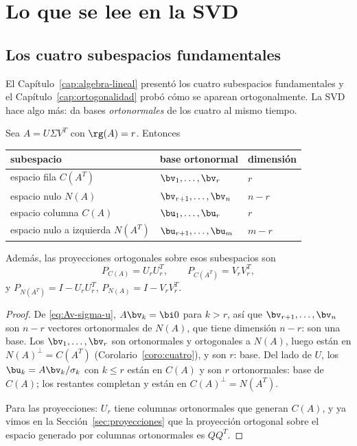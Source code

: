 \section{Lo que se lee en la SVD}
\label{sec:cuatro-SVD}

\subsection{Los cuatro subespacios fundamentales}

El Capítulo~\ref{cap:algebra-lineal} presentó los cuatro subespacios
fundamentales y el Capítulo~\ref{cap:ortogonalidad} probó cómo se aparean
ortogonalmente. La SVD hace algo más: da bases \emph{ortonormales} de los
cuatro al mismo tiempo.

\begin{proposition}\label{prop:cuatro-SVD}
Sea $A=U\Sigma V^T$ con $\rg(A)=r$. Entonces
\begin{center}
\renewcommand{\arraystretch}{1.25}
\begin{tabular}{@{}lll@{}}
\hline
subespacio & base ortonormal & dimensión\\
\hline
espacio fila $C(A^T)$ & $\bv_1,\dots,\bv_r$ & $r$\\
espacio nulo $N(A)$ & $\bv_{r+1},\dots,\bv_n$ & $n-r$\\
espacio columna $C(A)$ & $\bu_1,\dots,\bu_r$ & $r$\\
espacio nulo a izquierda $N(A^T)$ & $\bu_{r+1},\dots,\bu_m$ & $m-r$\\
\hline
\end{tabular}
\end{center}
Además, las proyecciones ortogonales sobre esos subespacios son
\[
P_{C(A)}=U_rU_r^T,
\qquad
P_{C(A^T)}=V_rV_r^T,
\]
y $P_{N(A^T)}=I-U_rU_r^T$, $P_{N(A)}=I-V_rV_r^T$.
\end{proposition}

\begin{proof}
De \eqref{eq:Av-sigma-u}, $A\bv_k=\bi 0$ para $k>r$, así que
$\bv_{r+1},\dots,\bv_n$ son $n-r$ vectores ortonormales de $N(A)$, que tiene
dimensión $n-r$: son una base. Los $\bv_1,\dots,\bv_r$ son ortonormales y
ortogonales a $N(A)$, luego están en $N(A)^\perp=C(A^T)$
(Corolario~\ref{coro:cuatro}), y son $r$: base. Del lado de $U$, los
$\bu_k=A\bv_k/\sigma_k$ con $k\le r$ están en $C(A)$ y son $r$ ortonormales:
base de $C(A)$; los restantes completan y están en $C(A)^\perp=N(A^T)$.

Para las proyecciones: $U_r$ tiene columnas ortonormales que generan $C(A)$,
y ya vimos en la Sección~\ref{sec:proyecciones} que la proyección ortogonal
sobre el espacio generado por columnas ortonormales es $QQ^T$.
\end{proof}

